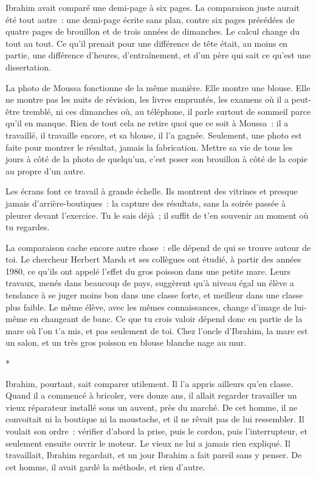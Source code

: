 \documentclass[10.5pt,twoside,openright]{book}
\newcommand{\asterisme}{\par\vspace{0.7em}\centerline{\color{gris}*\quad*\quad*}\vspace{0.7em}\par\noindent}
\begin{document}
Ibrahim avait comparé une demi-page à six pages. La comparaison juste aurait été tout autre : une demi-page écrite sans plan, contre six pages précédées de quatre pages de brouillon et de trois années de dimanches. Le calcul change du tout au tout. Ce qu’il prenait pour une différence de tête était, au moins en partie, une différence d’heures, d’entraînement, et d’un père qui sait ce qu’est une dissertation.

La photo de Moussa fonctionne de la même manière. Elle montre une blouse. Elle ne montre pas les nuits de révision, les livres empruntés, les examens où il a peut-être tremblé, ni ces dimanches où, au téléphone, il parle surtout de sommeil parce qu’il en manque. Rien de tout cela ne retire quoi que ce soit à Moussa : il a travaillé, il travaille encore, et sa blouse, il l’a gagnée. Seulement, une photo est faite pour montrer le résultat, jamais la fabrication. Mettre sa vie de tous les jours à côté de la photo de quelqu’un, c’est poser son brouillon à côté de la copie au propre d’un autre.

Les écrans font ce travail à grande échelle. Ils montrent des vitrines et presque jamais d’arrière-boutiques : la capture des résultats, sans la soirée passée à pleurer devant l’exercice. Tu le sais déjà ; il suffit de t’en souvenir au moment où tu regardes.

La comparaison cache encore autre chose : elle dépend de qui se trouve autour de toi. Le chercheur Herbert Marsh et ses collègues ont étudié, à partir des années 1980, ce qu’ils ont appelé l’effet du gros poisson dans une petite mare. Leurs travaux, menés dans beaucoup de pays, suggèrent qu’à niveau égal un élève a tendance à se juger moins bon dans une classe forte, et meilleur dans une classe plus faible. Le même élève, avec les mêmes connaissances, change d’image de lui-même en changeant de banc. Ce que tu crois valoir dépend donc en partie de la mare où l’on t’a mis, et pas seulement de toi. Chez l’oncle d’Ibrahim, la mare est un salon, et un très gros poisson en blouse blanche nage au mur.

\asterisme

Ibrahim, pourtant, sait comparer utilement. Il l’a appris ailleurs qu’en classe. Quand il a commencé à bricoler, vers douze ans, il allait regarder travailler un vieux réparateur installé sous un auvent, près du marché. De cet homme, il ne convoitait ni la boutique ni la moustache, et il ne rêvait pas de lui ressembler. Il voulait son ordre : vérifier d’abord la prise, puis le cordon, puis l’interrupteur, et seulement ensuite ouvrir le moteur. Le vieux ne lui a jamais rien expliqué. Il travaillait, Ibrahim regardait, et un jour Ibrahim a fait pareil sans y penser. De cet homme, il avait gardé la méthode, et rien d’autre.
\end{document}

